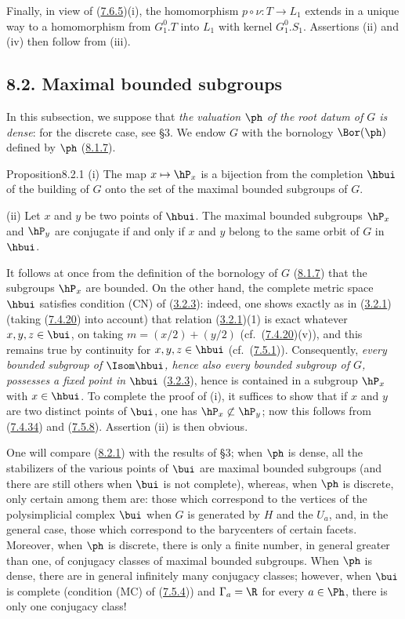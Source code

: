 \documentclass[12pt,a4paper,oneside,english]{smfart}
\makeatletter
\newcommand{\btanchor}[1]{\leavevmode\Hy@raisedlink{\hypertarget{bt:#1}{}}}
\newcommand{\btpageanchor}[1]{\Hy@raisedlink{\hypertarget{p:#1}{}}}
\newcommand{\btref}[1]{\hyperlink{bt:#1}{#1}}
\newcommand{\btpage}[1]{\marginnote{p.~#1}\btpageanchor{#1}}
\newcommand{\pg}[1]{\btpage{#1}}
\newcommand{\btsecB}[2]{%
  \par\needspace{4\baselineskip}\phantomsection
  \subsection*{#2}%
  \ifx\relax#1\relax\else\btanchor{#1}\fi}
\theoremstyle{definition}
\theoremstyle{bt}
\makeatother
\begin{document}
\pg{194}
Finally, in view of (\btref{7.6.5})(i), the homomorphism $p\circ\nu:T\to L_1$ extends in a
unique way to a homomorphism from $G^0_1.T$ into $L_1$ with kernel $G^0_1.S_1$.
Assertions (ii) and (iv) then follow from (iii).

\medskip

\btsecB{8.2}{8.2. Maximal bounded subgroups}

\medskip
In this subsection, we suppose that \emph{the valuation $\ph$ of the root datum of $G$
is dense}: for the discrete case, see \S3. We endow $G$ with the bornology $\Bor(\ph)$
defined by $\ph$ (\btref{8.1.7}).

\begin{stmt}{Proposition}{8.2.1}\btanchor{8.2.1}
(i) The map $x\mapsto\hP_x$ is a bijection from the completion $\hbui$ of the building
of $G$ onto the set of the maximal bounded subgroups of $G$.

(ii) Let $x$ and $y$ be two points of $\hbui$. The maximal bounded subgroups $\hP_x$ and
$\hP_y$ are conjugate if and only if $x$ and $y$ belong to the same orbit of $G$ in
$\hbui$.
\end{stmt}

It follows at once from the definition of the bornology of $G$ (\btref{8.1.7}) that the
subgroups $\hP_x$ are bounded. On the other hand, the complete metric space $\hbui$
satisfies condition (CN) of (\btref{3.2.3}): indeed, one shows exactly as in (\btref{3.2.1}) (taking
(\btref{7.4.20}) into account) that relation (\btref{3.2.1})(1) is exact whatever $x,y,z\in\bui$, on
taking $m=(x/2)+(y/2)$ (cf.\ (\btref{7.4.20})(v)), and this remains true by continuity for
$x,y,z\in\hbui$ (cf.\ (\btref{7.5.1})). Consequently, \emph{every bounded subgroup of
$\Isom\hbui$, hence also every bounded subgroup of $G$, possesses a fixed point in
$\hbui$} (\btref{3.2.3}), hence is contained in a subgroup $\hP_x$ with $x\in\hbui$. To complete
the proof of (i), it suffices to show that if $x$ and $y$ are two distinct points of
$\bui$, one has $\hP_x\not\subset\hP_y$; now this follows from (\btref{7.4.34}) and (\btref{7.5.8}).
Assertion (ii) is then obvious.

\btanchor{8.2.2}
One will compare (\btref{8.2.1}) with the results of \S3; when $\ph$ is dense, all the
stabilizers of the various points of $\bui$ are maximal bounded subgroups (and there are
still others when $\bui$ is not complete), whereas, when $\ph$ is discrete, only certain
among them are: those which correspond to the vertices of the polysimplicial complex
$\bui$ when $G$ is generated by $H$ and the $U_a$, and, in the general case, those which
correspond to the barycenters of certain facets. Moreover, when $\ph$ is discrete, there
is only a finite number, in general greater than one, of conjugacy classes of maximal
bounded subgroups. When $\ph$ is dense, there are in general infinitely many conjugacy
classes; however, when $\bui$ is complete (condition (MC) of (\btref{7.5.4})) and
$\Gamma_a=\R$ for every $a\in\Ph$, there is only one conjugacy class!
\end{document}
